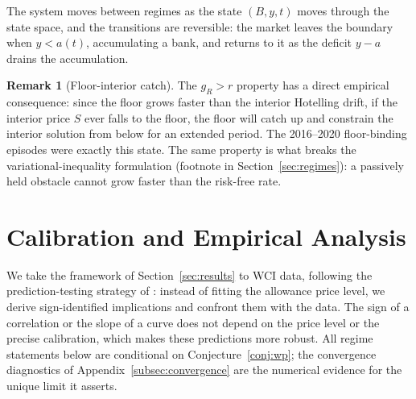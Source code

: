 \documentclass[11pt,letterpaper]{article}
\theoremstyle{plain}
\theoremstyle{definition}
\newtheorem{remark}[theorem]{Remark}
\numberwithin{equation}{section}
\begin{document}
The system moves between regimes as the state $(B,y,t)$ moves through the state space, and the transitions are reversible: the market leaves the boundary when $y<a(t)$, accumulating a bank, and returns to it as the deficit $y-a$ drains the accumulation.

\begin{remark}[Floor-interior catch]\label{rem:catchup}
The $g_R>r$ property has a direct empirical consequence: since the floor grows faster than the interior Hotelling drift, if the interior price $S$ ever falls to the floor, the floor will catch up and constrain the interior solution from below for an extended period. The 2016--2020 floor-binding episodes were exactly this state. The same property is what breaks the variational-inequality formulation (footnote in Section~\ref{sec:regimes}): a passively held obstacle cannot grow faster than the risk-free rate.
\end{remark}

\section{Calibration and Empirical Analysis}\label{sec:calibration}
 
We take the framework of Section~\ref{sec:results} to WCI data, following the prediction-testing strategy of \citet{hitzemann2018}: instead of fitting the allowance price level, we derive sign-identified implications and confront them with the data. The sign of a correlation or the slope of a curve does not depend on the price level or the precise calibration, which makes these predictions more robust. All regime statements below are conditional on Conjecture~\ref{conj:wp}; the convergence diagnostics of Appendix~\ref{subsec:convergence} are the numerical evidence for the unique limit it asserts.
\end{document}
